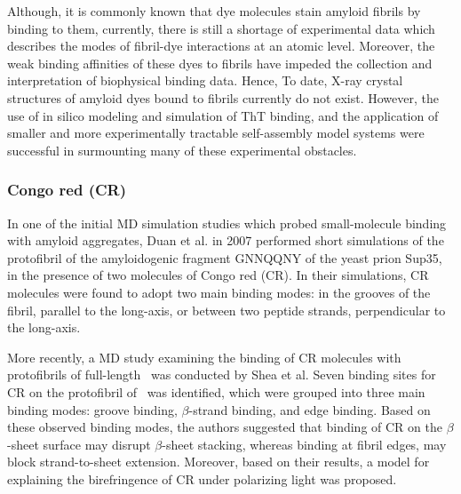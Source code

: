 Although, it is commonly known that dye molecules stain amyloid fibrils by binding to them, currently, there is still a shortage of experimental data which describes the modes of fibril-dye interactions at an atomic level.\cite{Frid:2007bo,Biancalana:2010p5053} Moreover, the weak binding affinities of these dyes to fibrils have impeded the collection and interpretation of biophysical binding data. Hence, To date, X-ray crystal structures of amyloid dyes bound to fibrils currently do not exist.  However, the use of in silico modeling and simulation of ThT binding, and the application of smaller and more experimentally tractable self-assembly model systems were successful in surmounting many of these experimental obstacles.

\subsubsection{Congo red (CR)}
In one of the initial MD simulation studies which probed small-molecule binding with amyloid aggregates, Duan et al.\cite{Wu:2007p361} in 2007 performed short simulations of the protofibril of the  amyloidogenic fragment GNNQQNY of the yeast prion Sup35, in the presence of two molecules of Congo red (CR).  In their simulations, CR molecules were found to adopt two main binding modes: in the grooves of the fibril, parallel to the long-axis, or between two peptide strands, perpendicular to the long-axis.


More recently, a MD study examining the binding of CR molecules with protofibrils of full-length \ was conducted by Shea et al.\cite{Shea:2012eh} Seven binding sites for CR on the protofibril of \ was identified, which were grouped into three main binding modes: groove binding, $\beta$-strand binding, and edge binding. Based on these observed binding modes, the authors suggested that binding of CR on the $\beta$-sheet surface may disrupt $\beta$-sheet stacking, whereas binding at fibril edges, may block strand-to-sheet extension.  Moreover, based on their results, a model for explaining the birefringence of CR under polarizing light was proposed.

